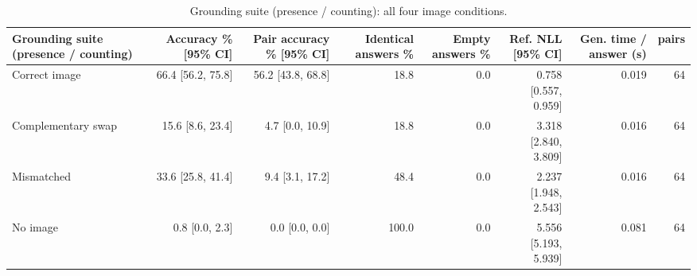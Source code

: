 \begin{table}[t]
\centering\small
\begin{tabular}{lrrrrrrr}
\toprule
Grounding suite (presence / counting) & Accuracy \% [95\% CI] & Pair accuracy \% [95\% CI] & Identical answers \% & Empty answers \% & Ref. NLL [95\% CI] & Gen. time / answer (s) & pairs \\
\midrule
Correct image & 66.4 [56.2, 75.8] & 56.2 [43.8, 68.8] & 18.8 & 0.0 & 0.758 [0.557, 0.959] & 0.019 & 64 \\
Complementary swap & 15.6 [8.6, 23.4] & 4.7 [0.0, 10.9] & 18.8 & 0.0 & 3.318 [2.840, 3.809] & 0.016 & 64 \\
Mismatched & 33.6 [25.8, 41.4] & 9.4 [3.1, 17.2] & 48.4 & 0.0 & 2.237 [1.948, 2.543] & 0.016 & 64 \\
No image & 0.8 [0.0, 2.3] & 0.0 [0.0, 0.0] & 100.0 & 0.0 & 5.556 [5.193, 5.939] & 0.081 & 64 \\
\bottomrule
\end{tabular}
\caption{Grounding suite (presence / counting): all four image conditions.}
\label{tab:task2_grounding_suite}
\end{table}
